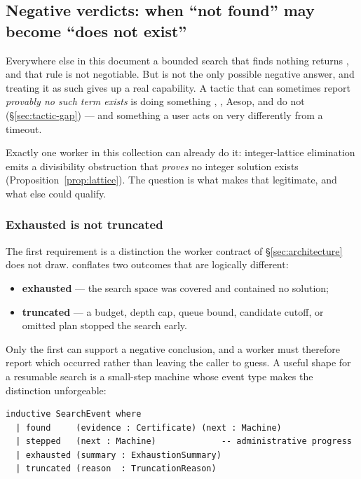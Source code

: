 \subsection{Negative verdicts: when ``not found'' may become ``does not exist''}
\label{sec:negative}

Everywhere else in this document a bounded search that finds nothing returns
\unknown{}, and that rule is not negotiable. But \unknown{} is not the only
possible negative answer, and treating it as such gives up a real capability. A
tactic that can sometimes report \emph{provably no such term exists} is doing
something , , Aesop,  and  do
not (\S\ref{sec:tactic-gap}) --- and something a user acts on very differently
from a timeout.

Exactly one worker in this collection can already do it: integer-lattice
elimination emits a divisibility obstruction that \emph{proves} no integer
solution exists (Proposition~\ref{prop:lattice}). The question is what makes
that legitimate, and what else could qualify.

\subsubsection*{Exhausted is not truncated}

The first requirement is a distinction the worker contract of
\S\ref{sec:architecture} does not draw.  conflates two
outcomes that are logically different:

\begin{itemize}[leftmargin=1.4em]
\item \textbf{exhausted} --- the search space was covered and contained no
  solution;
\item \textbf{truncated} --- a budget, depth cap, queue bound, candidate
  cutoff, or omitted plan stopped the search early.
\end{itemize}

Only the first can support a negative conclusion, and a worker must therefore
report which occurred rather than leaving the caller to guess. A useful shape
for a resumable search is a small-step machine whose event type makes the
distinction unforgeable:

\begin{lstlisting}
inductive SearchEvent where
  | found     (evidence : Certificate) (next : Machine)
  | stepped   (next : Machine)             -- administrative progress
  | exhausted (summary : ExhaustionSummary)
  | truncated (reason  : TruncationReason)
\end{lstlisting}

